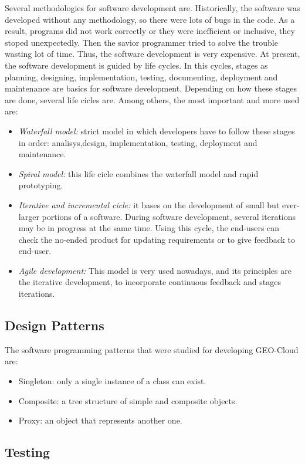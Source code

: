 Several methodologies for software development are. Historically, the software
was developed without any methodology, so there were lots of bugs in the
code. As a result, programs did not work correctly or they were inefficient or
inclusive, they stoped unexpectedly. Then the savior programmer tried to solve
the trouble wasting lot of time. Thus, the software development is very
expensive. 
At present, the software development is guided by life cycles. In this cycles,
stages as planning, designing, implementation, testing, documenting, deployment
and maintenance are basics for software development. Depending on how these
stages are done, several life cicles are. Among others, the most important and
more used are:
\begin{itemize}
\item \emph{Waterfall model:} strict model in which developers have to follow these
  stages in order: analisys,design, implementation, testing, deployment and maintenance.
\item \emph{Spiral model:} this life cicle combines the waterfall model and rapid
  prototyping.
\item \emph{Iterative and incremental cicle:} it bases on the development of small but
  ever-larger portions of a software. During software development, several
  iterations may be in progress at the same time. Using this cycle, the
  end-users can check the no-ended product for updating requirements or to give feedback
  to end-user.
\item \emph{Agile development:} This model is very used nowadays, and its principles
  are the iterative development, to incorporate continuous feedback and
  stages iterations. 
\end{itemize}

\subsection{Design Patterns}

The software programming patterns that were studied for developing GEO-Cloud
are:
\begin{itemize}
\item Singleton: only a single instance of a class can exist.
\item Composite: a tree structure of simple and composite objects.
\item Proxy: an object that represents another one.
\end{itemize}

\subsection{Testing}

